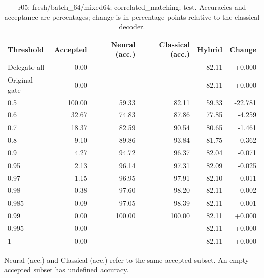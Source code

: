 \begin{table}[htbp]
\centering\small
\setlength{\tabcolsep}{3pt}
\caption{r05: fresh/batch\_64/mixed64; correlated\_matching; test. Accuracies and acceptance are percentages; change is in percentage points relative to the classical decoder.}
\begin{tabular}{lrrrrr}
\toprule
Threshold & Accepted & Neural (acc.) & Classical (acc.) & Hybrid & Change \\
\midrule
Delegate all & 0.00 & -- & -- & 82.11 & +0.000 \\
Original gate & 0.00 & -- & -- & 82.11 & +0.000 \\
0.5 & 100.00 & 59.33 & 82.11 & 59.33 & -22.781 \\
0.6 & 32.67 & 74.83 & 87.86 & 77.85 & -4.259 \\
0.7 & 18.37 & 82.59 & 90.54 & 80.65 & -1.461 \\
0.8 & 9.10 & 89.86 & 93.84 & 81.75 & -0.362 \\
0.9 & 4.27 & 94.72 & 96.37 & 82.04 & -0.071 \\
0.95 & 2.13 & 96.14 & 97.31 & 82.09 & -0.025 \\
0.97 & 1.15 & 96.95 & 97.91 & 82.10 & -0.011 \\
0.98 & 0.38 & 97.60 & 98.20 & 82.11 & -0.002 \\
0.985 & 0.09 & 97.05 & 98.39 & 82.11 & -0.001 \\
0.99 & 0.00 & 100.00 & 100.00 & 82.11 & +0.000 \\
0.995 & 0.00 & -- & -- & 82.11 & +0.000 \\
1 & 0.00 & -- & -- & 82.11 & +0.000 \\
\bottomrule
\end{tabular}
\par\smallskip\footnotesize Neural (acc.) and Classical (acc.) refer to the same accepted subset. An empty accepted subset has undefined accuracy.
\end{table}
